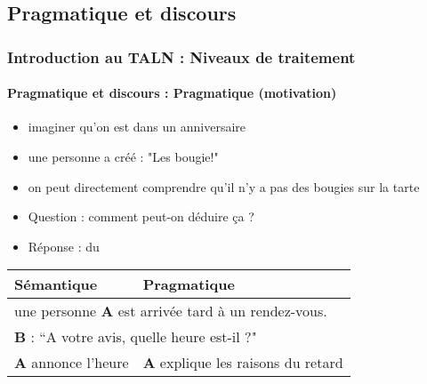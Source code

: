 \documentclass[xcolor=table]{beamer}
\begin{document}
\subsection{Pragmatique et discours}

\begin{frame}
\frametitle{Introduction au TALN : Niveaux de traitement}
\framesubtitle{Pragmatique et discours : Pragmatique (motivation)}

\begin{minipage}{0.7\textwidth}
\begin{itemize}
	\item imaginer qu'on est dans un anniversaire 
	\item une personne a créé : "Les bougie!"
	\item on peut directement comprendre qu'il n'y a pas des bougies sur la tarte
	\item Question : comment peut-on déduire ça ? 
	\item Réponse : du 
\end{itemize}
\end{minipage}
\begin{minipage}{0.28\textwidth}
\end{minipage}

\vfill
\begin{tabular}{|p{}|p{}|}
	\hline
	\bfseries Sémantique & \bfseries Pragmatique \\
	\hline 
	\multicolumn{2}{|l|}{une personne \textbf{A} est arrivée tard à un rendez-vous.} \\
	\multicolumn{2}{|l|}{\textbf{B} : ``A votre avis, quelle heure est-il ?"} \\
	\hline 
	\textbf{A} annonce l'heure &  \textbf{A} explique les raisons du retard \\
	\hline
\end{tabular}

\end{frame}
\end{document}

